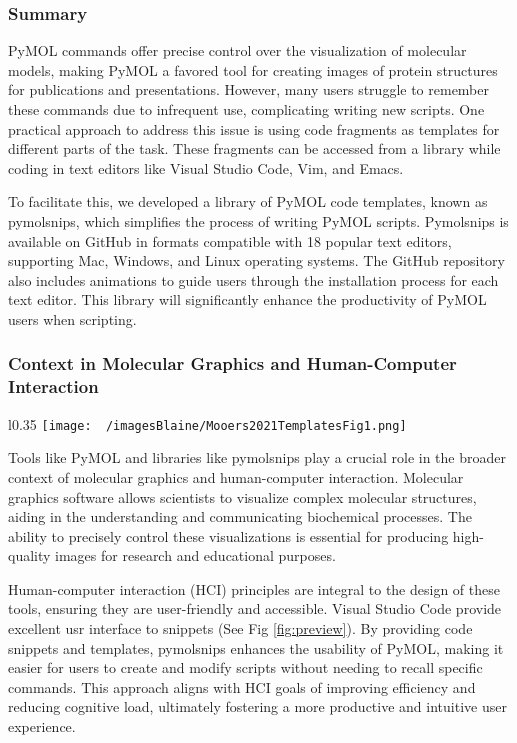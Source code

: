 
\subsubsection*{Summary}
PyMOL commands offer precise control over the visualization of molecular models, making PyMOL a favored tool for creating images of protein structures for publications and presentations. However, many users struggle to remember these commands due to infrequent use, complicating writing new scripts. 
One practical approach to address this issue is using code fragments as templates for different parts of the task. 
These fragments can be accessed from a library while coding in text editors like Visual Studio Code, Vim, and Emacs.


To facilitate this, we developed a library of PyMOL code templates, known as pymolsnips, which simplifies the process of writing PyMOL scripts. 
Pymolsnips is available on GitHub in formats compatible with 18 popular text editors, supporting Mac, Windows, and Linux operating systems. 
The GitHub repository also includes animations to guide users through the installation process for each text editor. 
This library will significantly enhance the productivity of PyMOL users when scripting.


\subsubsection*{Context in Molecular Graphics and Human-Computer Interaction}
\begin{wrapfigure}{l}{0.35\textwidth} %
\vspace{-10pt}
\texttt{[image: ~/imagesBlaine/Mooers2021TemplatesFig1.png]}
\caption{\footnotesize Text wrapped image }
\vspace{-10pt}
\label{fig:preview}
\end{wrapfigure}

Tools like PyMOL and libraries like pymolsnips play a crucial role in the broader context of molecular graphics and human-computer interaction. 
Molecular graphics software allows scientists to visualize complex molecular structures, aiding in the understanding and communicating biochemical processes. 
The ability to precisely control these visualizations is essential for producing high-quality images for research and educational purposes.


Human-computer interaction (HCI) principles are integral to the design of these tools, ensuring they are user-friendly and accessible.
Visual Studio Code provide excellent usr interface to snippets (See Fig \ref{fig:preview}). 
By providing code snippets and templates, pymolsnips enhances the usability of PyMOL, making it easier for users to create and modify scripts without needing to recall specific commands. 
This approach aligns with HCI goals of improving efficiency and reducing cognitive load, ultimately fostering a more productive and intuitive user experience.

